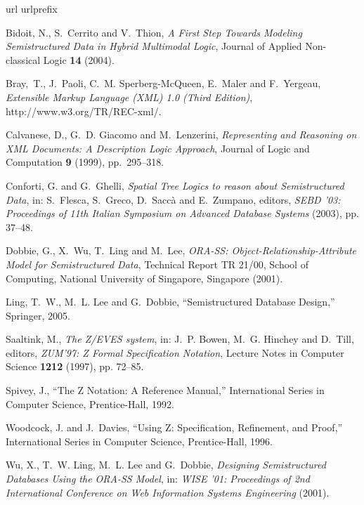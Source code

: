 \documentclass{entcs}
\begin{document}
\begin{thebibliography}{10}
\expandafter\ifx\csname url\endcsname\relax
  \def\url#1{\texttt{#1}}\fi
\expandafter\ifx\csname
urlprefix\endcsname\relax\def\urlprefix{URL }\fi
\newcommand{\enquote}[1]{``#1''}

Bidoit, N., S.~Cerrito and V.~Thion, \emph{{{A First Step Towards
Modeling
  Semistructured Data in Hybrid Multimodal Logic}}}, Journal of Applied
  Non-classical Logic \textbf{14} (2004).

Bray,~T., J.~Paoli, C.~M. Sperberg-McQueen, E.~Maler and
F.~Yergeau, 
  \emph{{Extensible Markup Language (XML) 1.0 (Third Edition)}}, \\
  http://www.w3.org/TR/REC-xml/.

Calvanese, D., G.~D. Giacomo and M.~Lenzerini, \emph{{Representing
and Reasoning on XML Documents: A Description Logic Approach}},
Journal of Logic and Computation \textbf{9} (1999), pp.~295--318.

Conforti, G. and G.~Ghelli, \emph{{Spatial Tree Logics to reason
about
  Semistructured Data}}, in: S.~Flesca, S.~Greco, D.~Sacc{\`a} and E.~Zumpano,
  editors, \emph{{SEBD} '03: Proceedings of 11th Italian Symposium on Advanced
  Database Systems} (2003), pp. 37--48.

Dobbie, G., X.~Wu, T.~Ling and M.~Lee, \emph{{ORA-SS:
  Object-Relationship-Attribute Model for Semistructured Data}}, Technical
  Report TR 21/00, School of Computing, National University of Singapore,
  Singapore (2001).

Ling, T.~W., M.~L. Lee and G.~Dobbie, \enquote{{Semistructured
Database Design},} Springer, 2005.

Saaltink, M., \emph{The {Z/EVES} system}, in: J.~P. Bowen, M.~G.
Hinchey and
  D.~Till, editors, \emph{ZUM'97: Z Formal Specification Notation},  Lecture
  Notes in Computer Science  \textbf{1212} (1997), pp. 72--85.

Spivey, J., \enquote{The {Z} Notation: A Reference Manual,}
International
  Series in Computer Science, Prentice-Hall, 1992.

Woodcock, J. and J.~Davies, \enquote{{Using Z: Specification,
Refinement, and
  Proof},} International Series in Computer Science, Prentice-Hall, 1996.

Wu, X., T.~W. Ling, M.~L. Lee and G.~Dobbie, \emph{{Designing
Semistructured
  Databases Using the ORA-SS Model}}, in: \emph{{WISE} '01: Proceedings of 2nd
  International Conference on Web Information Systems Engineering} (2001).

\end{thebibliography}
\end{document}

